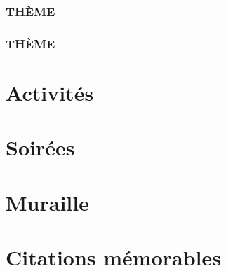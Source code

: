 \documentclass[poly,trombi]{valbonne}
\begin{document}
\subsection{THÈME}


\subsection{THÈME}



\chapter{Activités}


\chapter{\hspace{2mm}Soirées}

\minitoc \clearpage














\chapter{Muraille}


\newpage





\chapter{Citations mémorables}

\end{document}
